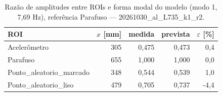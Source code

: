 \begin{table}[htbp]
  \centering
  \caption{Razão de amplitudes entre ROIs e forma modal do modelo (modo 1, 7{,}69 Hz), referência Parafuso — 20261030\_al\_L735\_k1\_r2.}
  \label{tab:forma_modal_20261030_al_L735_k1_r2}
  \begin{tabular}{lrrrr}
    \toprule
    ROI & $x$ [mm] & medida & prevista & $\varepsilon$ [\%] \\
    \midrule
    Acelerômetro & 305 & 0{,}475 & 0{,}473 & 0{,}4 \\
    Parafuso & 655 & 1{,}000 & 1{,}000 & 0{,}0 \\
    Ponto\_aleatorio\_marcado & 348 & 0{,}544 & 0{,}539 & 1{,}0 \\
    Ponto\_aleatorio\_liso & 479 & 0{,}705 & 0{,}737 & -4{,}4 \\
    \bottomrule
  \end{tabular}
\end{table}
